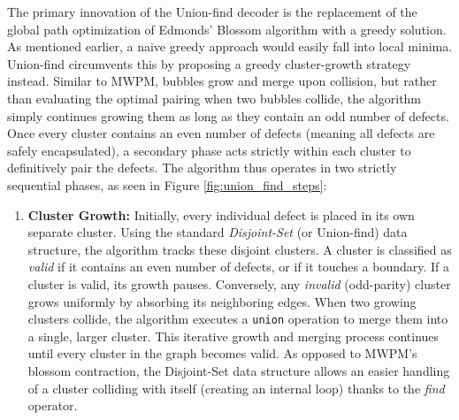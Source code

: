 The primary innovation of the Union-find decoder is the replacement of the global path optimization of Edmonds' Blossom algorithm with a greedy solution. As mentioned earlier, a naive greedy approach would easily fall into local minima. Union-find circumvents this by proposing a greedy cluster-growth strategy instead. Similar to MWPM, bubbles grow and merge upon collision, but rather than evaluating the optimal pairing when two bubbles collide, the algorithm simply continues growing them as long as they contain an odd number of defects. Once every cluster contains an even number of defects (meaning all defects are safely encapsulated), a secondary phase acts strictly within each cluster to definitively pair the defects. The algorithm thus operates in two strictly sequential phases, as seen in Figure \ref{fig:union_find_steps}:
\begin{enumerate}
    \item {} \textbf{Cluster Growth:} Initially, every individual defect is placed in its own separate cluster. Using the standard \textit{Disjoint-Set} (or Union-find) data structure, the algorithm tracks these disjoint clusters. A cluster is classified as \textit{valid} if it contains an even number of defects, or if it touches a boundary. If a cluster is valid, its growth pauses. Conversely, any \textit{invalid} (odd-parity) cluster grows uniformly by absorbing its neighboring edges. When two growing clusters collide, the algorithm executes a \texttt{union} operation to merge them into a single, larger cluster. This iterative growth and merging process continues until every cluster in the graph becomes valid. As opposed to MWPM's blossom contraction, the Disjoint-Set data structure allows an easier handling of a cluster colliding with itself (creating an internal loop) thanks to the \textit{find} operator.
    

\end{enumerate}
